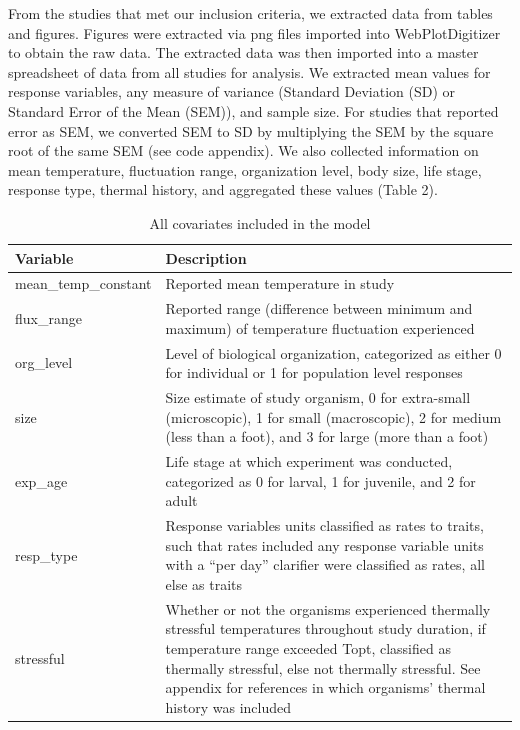 \documentclass[12pt,twoside]{reedthesis}
\begin{document}
From the studies that met our inclusion criteria, we extracted data from tables and figures. Figures were extracted via png files imported into WebPlotDigitizer to obtain the raw data. The extracted data was then imported into a master spreadsheet of data from all studies for analysis. We extracted mean values for response variables, any measure of variance (Standard Deviation (SD) or Standard Error of the Mean (SEM)), and sample size. For studies that reported error as SEM, we converted SEM to SD by multiplying the SEM by the square root of the same SEM (see code appendix). We also collected information on mean temperature, fluctuation range, organization level, body size, life stage, response type, thermal history, and aggregated these values (Table 2).
\begin{table}

\caption{\label{tab:unnamed-chunk-9}All covariates included in the model}
\centering
\begin{tabular}[t]{l>{\raggedright\arraybackslash}p{8cm}}
\toprule
\textbf{Variable} & \textbf{Description}\\
\midrule
mean\_temp\_constant & Reported mean temperature in study\\
flux\_range & Reported range (difference between minimum 
                                     and maximum) of temperature fluctuation experienced\\
org\_level & Level of biological organization, categorized
                                     as either 0 for individual or 1 for population level
                                     responses\\
size & Size estimate of study organism, 0 for extra-small
                                     (microscopic), 1 for small (macroscopic), 2 for medium 
                                     (less than a foot), and 3 for large (more than a foot)\\
exp\_age & Life stage at which experiment was conducted, 
                                     categorized as 0 for larval, 1 for juvenile, and 
                                     2 for adult\\
\addlinespace
resp\_type & Response variables units classified as rates to traits, 
                                     such that rates included any response variable units with a
                                     “per day” clarifier were classified as rates, all else as
                                     traits\\
stressful & Whether or not the organisms experienced thermally stressful 
                                     temperatures throughout study duration, if temperature range 
                                     exceeded Topt, classified as thermally stressful, else not
                                     thermally stressful. See appendix for references in which
                                     organisms’ thermal history was included\\
\bottomrule
\end{tabular}
\end{table}
\end{document}

